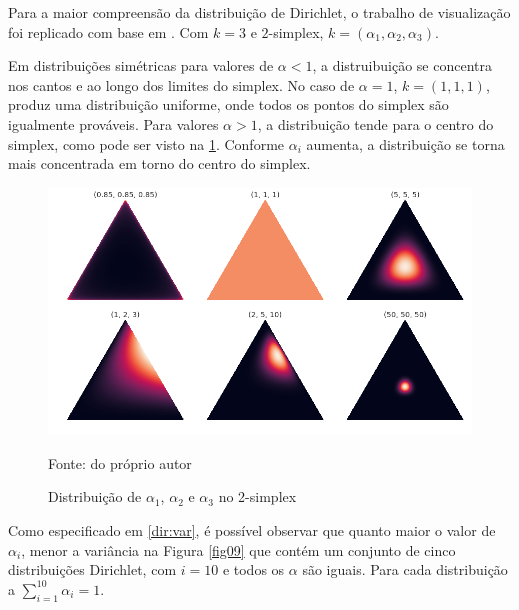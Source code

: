 Para a maior compreensão da distribuição de Dirichlet, o trabalho de visualização foi replicado com base em \cite{liu2019}. Com $k=3$ e $2$-simplex, $k=(\alpha_1, \alpha_2, \alpha_3)$. 

Em distribuições simétricas para valores de $\alpha<1$, a distruibuição se concentra nos cantos e ao longo dos limites do simplex. No caso de $\alpha=1$, $k=(1,1,1)$, produz uma distribuição uniforme, onde todos os pontos do simplex são igualmente prováveis. Para valores $\alpha>1$, a distribuição tende para o centro do simplex, como pode ser visto na \ref{fig08}. Conforme $\alpha_i$ aumenta, a distribuição se torna mais concentrada em torno do centro do simplex. 


\begin{figure}[!h]
	\centering
	\includegraphics[keepaspectratio=true,scale=0.4]{figuras/dist-diri-simplex.png}
	\caption{Distribuição de $\alpha_1$, $\alpha_2$ e $\alpha_3$ no 2-simplex}
	Fonte: do próprio autor
	\label{fig08}
\end{figure}


Como especificado em \ref{dir:var}, é possível observar que quanto maior o valor de $\alpha_i$, menor a variância na Figura \ref{fig09} que contém um conjunto de cinco distribuições Dirichlet, com $i=10$ e todos os $\alpha$ são iguais. Para cada distribuição a $\sum_{i=1}^{10} \alpha_i = 1$.



